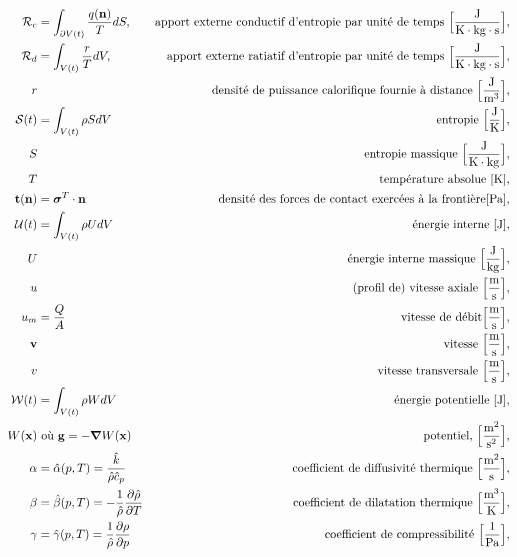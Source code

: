 \begin{align*}
      \mathcal{R}_c &= \int_{\partial V(t)} \frac{q(\vb{n})}{T}dS, & \textrm{apport externe conductif d'entropie par unité de temps }\Big[\si{\frac{J}{K \cdot kg \cdot \s}}\Big],\\
      \mathcal{R}_d &= \int_{V(t)} \frac{r}{T} dV, & \textrm{apport externe ratiatif d'entropie par unité de temps }\Big[\si{\frac{J}{K \cdot kg \cdot s}}\Big],\\
      r & & \textrm{densité de puissance calorifique fournie à distance } \Big[\si{\frac{J}{m^3}}\Big],\\
      \mathcal{S}(t) &= \int_{V(t)} \rho S dV & \textrm{entropie } \Big[\si{\frac{J}{K}}\Big],\\
      S & & \textrm{entropie massique } \Big[\si{\frac{J}{K \cdot kg}}\Big],\\
      T & & \textrm{température absolue } [\si{K}],\\
      \vb{t}(\vb{n}) &= \bs{\sigma}^T \cdot \vb{n} & \textrm{densité des forces de contact exercées à la frontière} [\si{Pa}],\\
      \mathcal{U}(t) &= \int_{V(t)} \rho U dV & \textrm{énergie interne } [\si{J}],\\
      U & & \textrm{énergie interne massique } \Big[\si{\frac{J}{kg}}\Big],\\
      u & & \textrm{(profil de) vitesse axiale } \Big[\si{\frac{m}{s}}\Big],\\
      u_m &= \frac{Q}{A} & \textrm{vitesse de débit} \Big[\si{\frac{m}{s}}\Big],\\
      \vb{v} & & \textrm{vitesse } \Big[\si{\frac{m}{s}}\Big],\\
      v & & \textrm{vitesse transversale } \Big[\si{\frac{m}{s}}\Big],\\
      \mathcal{W}(t) &= \int_{V(t)} \rho W dV & \textrm{énergie potentielle } [\si{J}],\\
      W(\vb{x}) & \textrm{ où } \vb{g} = -\grad W(\vb{x}) & \textrm{potentiel, }\Big[\si{\frac{m^2}{s^2}}\Big],\\
      \alpha &= \hat{\alpha}(p,T) = \frac{\hat{k}}{\hat{\rho}\hat{c}_p} & \textrm{coefficient de diffusivité thermique } \Big[\si{\frac{m^2}{s}}\Big], \\
      \beta &= \hat{\beta}(p,T) = -\recip{\hat{\rho}} \pdv{\hat{\rho}}{T} & \textrm{coefficient de dilatation thermique } \Big[\si{\frac{m^3}{K}}\Big],\\
      \gamma &= \hat{\gamma}(p,T) = \recip{\hat{\rho}} \pdv{\rho}{p} & \textrm{coefficient de compressibilité } \Big[\si{\recip{Pa}}\Big],\\

\end{align*}
